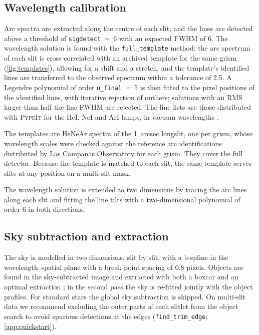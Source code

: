 \documentclass[11pt,a4paper]{article}
\newcommand{\pypeit}{\textsc{PypeIt}}
\newcommand{\code}[1]{\texttt{#1}}
\begin{document}
\subsection{Wavelength calibration}
\label{sec:wavecal_method}

Arc spectra are extracted along the centre of each slit, and the lines are
detected above a threshold of \code{sigdetect}~=~6 with an expected FWHM of
\SI{6}{\pixel}. The wavelength solution is found with the \code{full\_template}
method: the arc spectrum of each slit is cross-correlated with an archived
template for the same grism (\cref{fig:templates}), allowing for a shift and a
stretch, and the template's identified lines are transferred to the observed
spectrum within a tolerance of \SI{2.5}{\pixel}. A Legendre polynomial of order
\code{n\_final}~=~5 is then fitted to the pixel positions of the identified
lines, with iterative rejection of outliers; solutions with an RMS larger than
half the line FWHM are rejected. The line lists are those distributed with
\pypeit{} for the HeI, NeI and ArI lamps, in vacuum wavelengths \citep{NIST_ASD}.

The templates are HeNeAr spectra of the \SI{1}{arcsec} longslit, one per
grism, whose wavelength scales were checked against the reference arc
identifications distributed by Las Campanas Observatory for each grism. They
cover the full detector. Because the template is matched to each slit, the
same template serves slits at any position on a multi-slit mask.

The wavelength solution is extended to two dimensions by tracing the arc lines
along each slit and fitting the line tilts with a two-dimensional polynomial of
order 6 in both directions.

\subsection{Sky subtraction and extraction}
\label{sec:skysub}

The sky is modelled in two dimensions, slit by slit, with a b-spline in the
wavelength--spatial plane \citep{Kelson2003} with a break-point spacing of
0.8 pixels. Objects are found in the sky-subtracted image and extracted with both
a boxcar and an optimal extraction \citep{Horne1986}; in the second pass the sky
is re-fitted jointly with the object profiles. For standard stars the global sky
subtraction is skipped. On multi-slit data we recommend excluding the outer
parts of each slitlet from the object search to avoid spurious detections at the
edges (\code{find\_trim\_edge}; \cref{app:quickstart}).
\end{document}
